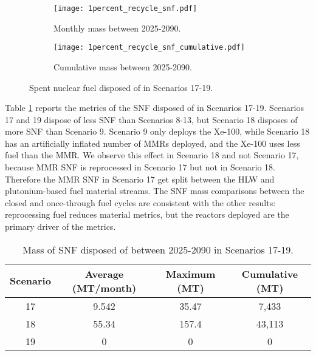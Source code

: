 \begin{figure}[h!]
    \centering
    \begin{subfigure}[b]{0.49\textwidth}
        \centering
        \texttt{[image: 1percent\_recycle\_snf.pdf]}
        \caption{Monthly mass between 2025-2090.}
        \label{fig:1percent_recycle_snf_all}
    \end{subfigure}
    \hfill
    \begin{subfigure}[b]{0.49\textwidth}
        \centering
        \texttt{[image: 1percent\_recycle\_snf\_cumulative.pdf]}
        \caption{Cumulative mass between 2025-2090.}
        \label{fig:1percent_recycle_snf_cumulative}
    \end{subfigure}
       \caption{Spent nuclear fuel disposed of in Scenarios 17-19.}
       \label{fig:1percent_recycle_snf}
\end{figure}

Table \ref{tab:s17-19_snf} reports the metrics of the \gls{SNF} 
disposed of in Scenarios 17-19. Scenarios 17 and 19 dispose of 
less \gls{SNF} than Scenarios 8-13, but Scenario 18 disposes of 
more \gls{SNF} than Scenario 9. Scenario 9 only deploys the 
Xe-100, while Scenario 18 has an artificially inflated number of 
\glspl{MMR} deployed, and the Xe-100 uses less fuel than the 
\gls{MMR}. We observe this effect in Scenario 18 and not 
Scenario 17, because \gls{MMR} \gls{SNF} is reprocessed in 
Scenario 17 but not in Scenario 18. Therefore the \gls{MMR} 
\gls{SNF} in Scenario 17 get split between the 
\gls{HLW} and plutonium-based fuel material streams. The \gls{SNF} mass comparisons 
between the closed and once-through fuel cycles are consistent 
with the other results: reprocessing fuel reduces material metrics, 
but the reactors deployed are the primary driver of the metrics. 

\begin{table}[h!]
    \centering 
    \caption{Mass of SNF disposed of between 2025-2090 in 
    Scenarios 17-19.}
    \label{tab:s17-19_snf}
    \begin{tabular}{c c c c}
        \hline 
        Scenario & Average (MT/month) & Maximum (MT) & Cumulative (MT) \\
        \hline
        17 & 9.542 & 35.47 & 7,433\\
        18 & 55.34 & 157.4 & 43,113\\
        19 & 0 & 0 & 0 \\
        \hline
    \end{tabular}
\end{table}


